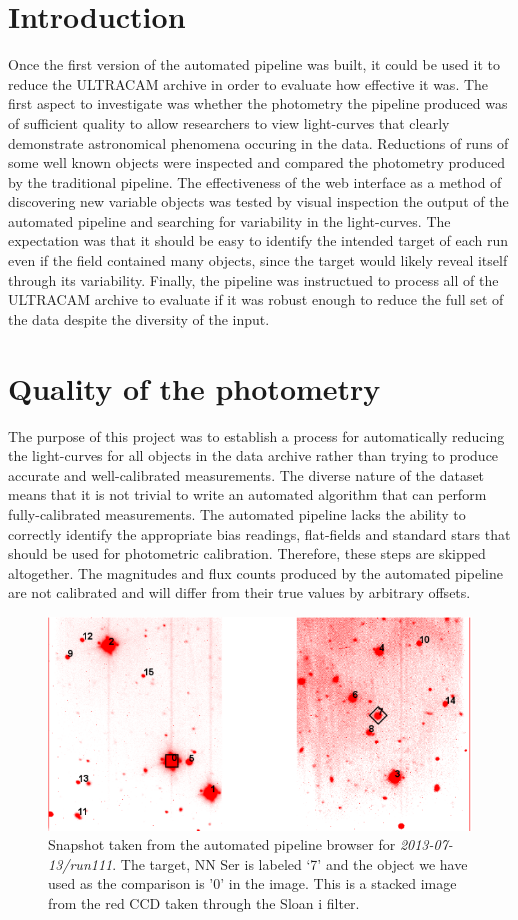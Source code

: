 \section{Introduction}
Once the first version of the automated pipeline was built, it could be used it to reduce the ULTRACAM archive in order to evaluate how effective it was. The first aspect to investigate was whether the photometry the pipeline produced was of sufficient quality to allow researchers to view light-curves that clearly demonstrate astronomical phenomena occuring in the data. Reductions of runs of some well known objects were inspected and compared the photometry produced by the traditional pipeline. The effectiveness of the web interface as a method of discovering new variable objects was tested by visual inspection the output of the automated pipeline and searching for variability in the light-curves. The expectation was that it should be easy to identify the intended target of each run even if the field contained many objects, since the target would likely reveal itself through its variability. Finally, the pipeline was instructued to process all of the ULTRACAM archive to evaluate if it was robust enough to reduce the full set of the data despite the diversity of the input. 

\section{Quality of the photometry}
The purpose of this project was to establish a process for automatically reducing the light-curves for all objects in the data archive rather than trying to produce accurate and well-calibrated measurements. The diverse nature of the dataset means that it is not trivial to write an automated algorithm that can perform fully-calibrated measurements. The automated pipeline lacks the ability to correctly identify the appropriate bias readings, flat-fields and standard stars that should be used for photometric calibration. Therefore, these steps are skipped altogether. The magnitudes and flux counts produced by the automated pipeline are not calibrated and will differ from their true values by arbitrary offsets. 

\begin{figure}
\centering
\includegraphics[width=120mm]{images/2013-07-13-run111-r-withlabels.png}
\caption{Snapshot taken from the automated pipeline browser for \emph{2013-07-13/run111}. The target, {NN Ser} is labeled `7' and the object we have used as the comparison is  '0' in the image. This is a stacked image from the red CCD taken through the Sloan i filter. }
\label{fig:nnserfield}
\end{figure}

